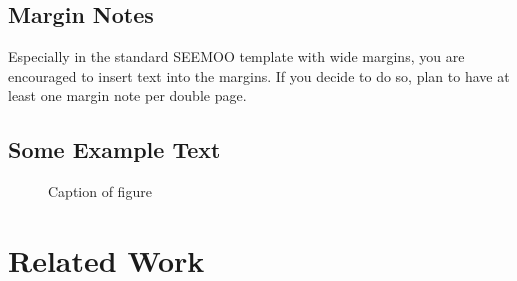 \section{Margin Notes}

Especially in the standard SEEMOO template with wide margins, you are
 encouraged to insert text into the
margins. If you decide to do so, plan to have at least one margin note
per double page.

\section{Some Example Text}
\lipsum[3]

\begin{figure}
\centering
\setlength\figureheight{5cm}
\setlength{}

\caption[Caption for list of figures]{Caption of figure}
\label{fig:example}
\end{figure}

\lipsum[6-10]

\chapter{Related Work}\label{ch:relatedwork}
\glsresetall %

\lipsum[4]